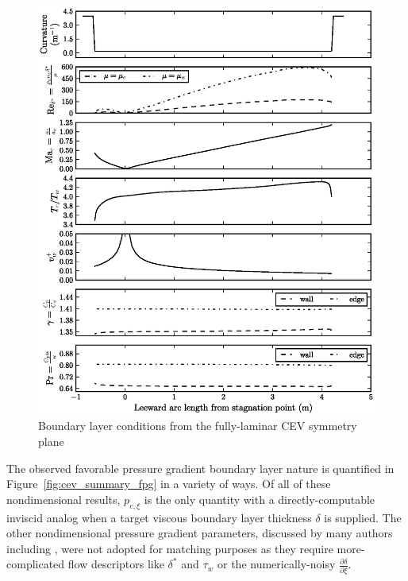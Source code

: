 \documentclass[letterpaper,11pt,nointlimits,reqno]{amsart}
\begin{document}
\begin{figure}[p]
  \centering
  \includegraphics[]{cev_summary1}
  \caption{
    \label{fig:cev_summary1}
    Boundary layer conditions from the fully-laminar CEV symmetry plane
  }
\end{figure}

The observed favorable pressure gradient boundary layer nature is quantified in
Figure~\ref{fig:cev_summary_fpg} in a variety of ways.  Of all of these
nondimensional results, $p_{e,\xi}$ is the only quantity with a
directly-computable inviscid analog when a target viscous boundary layer
thickness $\delta$ is supplied.  The other nondimensional pressure gradient
parameters, discussed by many authors including
\citet{Sreenivasan1982Laminarescent}, were not adopted for matching purposes as
they require more-complicated flow descriptors like $\delta^\ast$ and $\tau_w$
or the numerically-noisy $\frac{\partial\delta}{\partial\xi}$.
\end{document}
